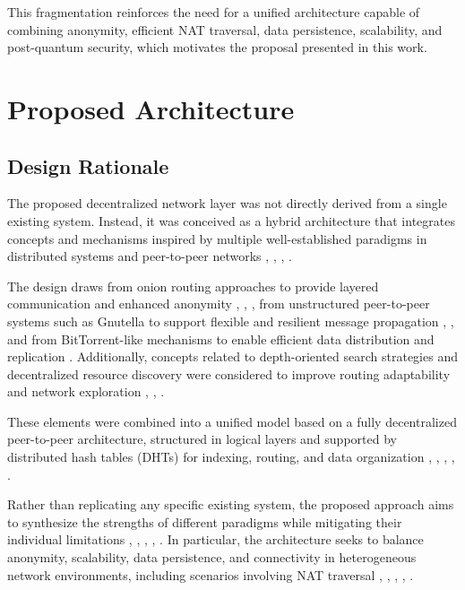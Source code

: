\documentclass[
  12pt,
  oneside,
  a4paper,
  chapter=TITLE,
  section=TITLE,
  english,
  brazil
]{abntex2}
\begin{document}
This fragmentation reinforces the need for a unified architecture capable of combining anonymity, efficient NAT traversal, data persistence, scalability, and post-quantum security, which motivates the proposal presented in this work.







\chapter{Proposed Architecture}


\section{Design Rationale}

The proposed decentralized network layer was not directly derived from a single existing system. Instead, it was conceived as a hybrid architecture that integrates concepts and mechanisms inspired by multiple well-established paradigms in distributed systems and peer-to-peer networks \cite{li2022unreachable}, \cite{augustine2022byzantine}, \cite{mirzaei2018pk}, \cite{qian2016garlic}.

The design draws from onion routing approaches to provide layered communication and enhanced anonymity \cite{tosic2022spatial}, \cite{mirzaei2018pk}, \cite{qian2016garlic}, from unstructured peer-to-peer systems such as Gnutella to support flexible and resilient message propagation \cite{mehr2019unstructured}, \cite{augustine2022byzantine}, and from BitTorrent-like mechanisms to enable efficient data distribution and replication \cite{mehr2019unstructured}. Additionally, concepts related to depth-oriented search strategies and decentralized resource discovery were considered to improve routing adaptability and network exploration \cite{mehr2019unstructured}, \cite{augustine2022byzantine}, \cite{qian2016garlic}.

These elements were combined into a unified model based on a fully decentralized peer-to-peer architecture, structured in logical layers and supported by distributed hash tables (DHTs) for indexing, routing, and data organization \cite{stoica2001chord}, \cite{maymounkov2002kademlia}, \cite{rowstron2001pastry}, \cite{zhao2001tapestry}, \cite{augustine2022byzantine}.

Rather than replicating any specific existing system, the proposed approach aims to synthesize the strengths of different paradigms while mitigating their individual limitations \cite{li2022unreachable}, \cite{tosic2022spatial}, \cite{augustine2022byzantine}, \cite{mirzaei2018pk}, \cite{qian2016garlic}. In particular, the architecture seeks to balance anonymity, scalability, data persistence, and connectivity in heterogeneous network environments, including scenarios involving NAT traversal \cite{li2022unreachable}, \cite{tosic2022spatial}, \cite{augustine2022byzantine}, \cite{mirzaei2018pk}, \cite{qian2016garlic}.
\end{document}
